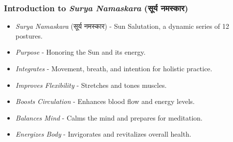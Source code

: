 
\begin{frame}[fragile]\frametitle{Introduction to \textit{Surya Namaskara} (सूर्य नमस्कार)}

  \begin{itemize}
	\item \textit{Surya Namaskara} (सूर्य नमस्कार) - Sun Salutation, a dynamic series of 12 postures.
	\item \textit{Purpose} - Honoring the Sun and its energy.
	\item \textit{Integrates} - Movement, breath, and intention for holistic practice.
	\item \textit{Improves Flexibility} - Stretches and tones muscles.
	\item \textit{Boosts Circulation} - Enhances blood flow and energy levels.
	\item \textit{Balances Mind} - Calms the mind and prepares for meditation.
	\item \textit{Energizes Body} - Invigorates and revitalizes overall health.
  \end{itemize}
\end{frame}






